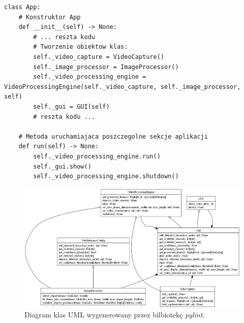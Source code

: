 \begin{lstlisting}[caption={Tworzenie obiektów klas wewnątrz \emph{App} oraz uruchomienie w niej różnych sekcji aplikacji.}, label={lst:app-instancjowanie}]
class App:
    # Konstruktor App
    def __init__(self) -> None:
        # ... reszta kodu
        # Tworzenie obiektow klas:
        self._video_capture = VideoCapture()
        self._image_processor = ImageProcessor()
        self._video_processing_engine = VideoProcessingEngine(self._video_capture, self._image_processor, self)
        self._gui = GUI(self)
        # reszta kodu ...

    # Metoda uruchamiajaca poszczegolne sekcje aplikacji
    def run(self) -> None:
        self._video_processing_engine.run()
        self._gui.show()
        self._video_processing_engine.shutdown()
\end{lstlisting}







\begin{figure}[H]
    \centering
    \includegraphics[angle=270, scale = 0.85]{r_implementacja/klasy/classes_MyProject.png}
    \caption{Diagram klas UML wygenerowany przez bilbiotekę \emph{pylint}.}
    \label{fig:diagram-klas}
\end{figure}
